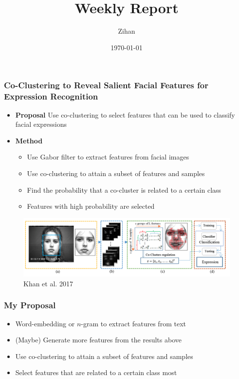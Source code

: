 \documentclass[11pt]{beamer}
\title{Weekly Report}
\author{Zihan}
\date{\today}
\begin{document}


\begin{frame}
    \frametitle{Co-Clustering to Reveal Salient Facial Features for Expression Recognition}
    \begin{itemize}
        \item \textbf{Proposal} Use co-clustering to select features that can be used to classify facial expressions
        \item \textbf{Method}
              \begin{itemize}
                  \item Use Gabor filter to extract features from facial images
                  \item Use co-clustering to attain a subset of features and samples
                  \item Find the probability that a co-cluster is related to a certain class
                  \item Features with high probability are selected
              \end{itemize}
    \end{itemize}
    \begin{figure}[htbp]
        \centering
        \includegraphics[width=\textwidth]{khan.png}
        \caption{Khan et al. 2017}
    \end{figure}
\end{frame}


\begin{frame}
    \frametitle{My Proposal}
    \begin{itemize}
        \item Word-embedding or $n$-gram to extract features from text
        \item (Maybe) Generate more features from the results above
        \item Use co-clustering to attain a subset of features and samples
        \item Select features that are related to a certain class most
    \end{itemize}
\end{frame}
\end{document}
